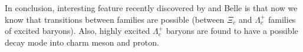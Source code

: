  




In conclusion, interesting feature recently discovered by \babar and Belle is that 
now we know that transitions between families are possible (between 
$\Xi_c$ and $\Lambda_c^+$ families of excited baryons). Also, highly 
excited $\Lambda_c^+$ baryons are found to have a possible decay mode into charm meson and proton.    



